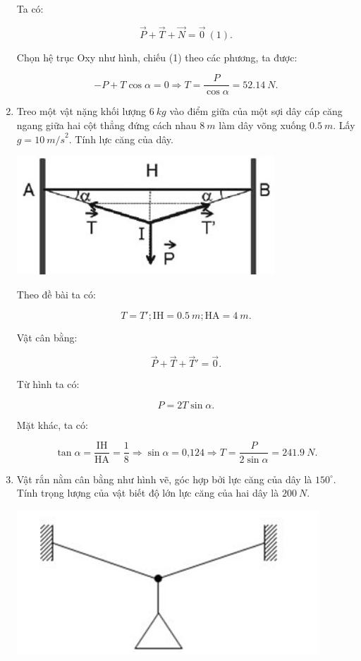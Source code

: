 \begin{enumerate}[label=\bfseries Bài \arabic*:,leftmargin=1.5cm]
{		Ta có:
		
		$$\vec P + \vec T + \vec N = \vec 0\ (1).$$
		
		Chọn hệ trục Oxy như hình, chiếu (1) theo các phương, ta được:
		
		$$ - P + T\cos \alpha = 0 \Rightarrow T = \dfrac{P}{\cos \alpha} = \SI{52,14}{N}.$$
	}
	\item {}
	
	
	{
		Treo một vật nặng khối lượng $\SI{6}{kg}$ vào điểm giữa của một sợi dây cáp căng ngang giữa hai cột thẳng đứng cách nhau $\SI{8}{m}$ làm dây võng xuống $\SI{0,5}{m}$. Lấy $g=\SI{10}{m/s}^2$. Tính lực căng của dây.
	}
	
	\hideall
	{
		\begin{center}
			\includegraphics[scale=0.8]{../figs/VN10-2022-PH-TP019-10.jpg}
		\end{center}
		
		Theo đề bài ta có:
		
		$$T = T'; \text{IH} = \SI{0,5}{m}; \text{HA} = \SI{4}{m}.$$
		
		Vật cân bằng:
		
		$$\vec P + \vec T + \vec T' = \vec 0.$$
		
		Từ hình ta có:
		
		$$P = 2T \sin \alpha.$$
		
		Mặt khác, ta có:
		
		$$\tan \alpha = \dfrac{\text{IH}}{\text{HA}} = \dfrac{1}{8} \Rightarrow \sin \alpha = \text{0,124} \Rightarrow T = \dfrac{P}{2\sin \alpha} = \SI{241,9}{N}.$$
	}
	\item {}
	
	
	{
		Vật rắn nằm cân bằng như hình vẽ, góc hợp bởi lực căng của dây là $150^\circ$. Tính trọng lượng của vật biết độ lớn lực căng của hai dây là $\SI{200}{N}$.
		\begin{center}
			\includegraphics[scale=0.8]{../figs/VN10-2022-PH-TP019-8.jpg}
		\end{center}
	}
	

\end{enumerate}

